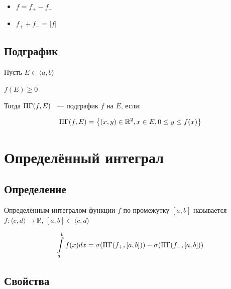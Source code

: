\documentclass{article}
\begin{document}
	        \begin{itemize}
	    
	            \item $f = f_+ - f_-$
	        
	            \item $f_+ + f_- = |f|$
	        
	        \end{itemize}
	    
	    \subsection{Подграфик}
	    
            Пусть $E \subset \langle a, b \rangle$
        
            $f(E) \geq 0$
        
            Тогда $\Pi\Gamma(f, E)$ ~--- подграфик $f$ на $E$, если:
        
	        $$\Pi\Gamma (f, E) = \left\{ (x, y) \in \mathbb{R}^2, x \in E, 0 \leq y \leq f(x) \right\}$$
	    
	\newpage

	\section{Определённый интеграл}

        \subsection{Определение}
        
            Определённым интегралом функции $f$ по промежутку $[a, b]$ называется $f: \langle c, d \rangle \rightarrow \mathbb{R}$, $[a, b] \subset \langle c, d \rangle$
        
            $$\int\limits^b_a f(x)dx = \sigma (\Pi\Gamma (f_+, [a, b])) - \sigma (\Pi\Gamma (f_-, [a, b]))$$
		
		\subsection{Свойства}
		
\end{document}
